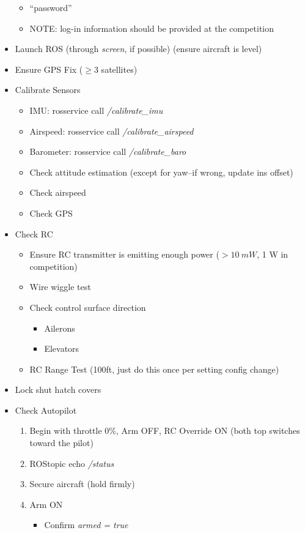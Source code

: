 \documentclass[]{auvsi_doc}
\begin{document}
\begin{itemize}
\begin{itemize}
		\item ``password'' 
		\item NOTE: log-in information should be provided at the competition
	\end{itemize}
	\item Launch ROS (through \textit{screen}, if possible) (ensure aircraft is level)
	\item Ensure GPS Fix ($\geq 3$ satellites)
	\item Calibrate Sensors
	\begin{itemize}
		\item IMU: rosservice call \textit{/calibrate\_imu}
		\item Airspeed: rosservice call \textit{/calibrate\_airspeed}
		\item Barometer: rosservice call \textit{/calibrate\_baro}
		\item Check attitude estimation (except for yaw--if wrong, update ins offset)
		\item Check airspeed
		\item Check GPS
	\end{itemize}
	\item Check RC
	\begin{itemize}
		\item Ensure RC transmitter is emitting enough power ($>10~mW$, 1 W in competition)
		\item Wire wiggle test
		\item Check control surface direction
		\begin{itemize}
			\item Ailerons
			\item Elevators
		\end{itemize}
		\item RC Range Test (100ft, just do this once per setting config change)
	\end{itemize}
	\item Lock shut hatch covers
	\item Check Autopilot
	\begin{enumerate}
		\item Begin with throttle 0\%, Arm OFF, RC Override ON (both top switches toward the pilot)
		\item ROStopic echo \textit{/status}
		\item Secure aircraft (hold firmly)
		\item Arm ON
		\begin{itemize}
			\item Confirm \textit{armed = true}

\end{itemize}
\end{enumerate}
\end{itemize}
\end{document}
